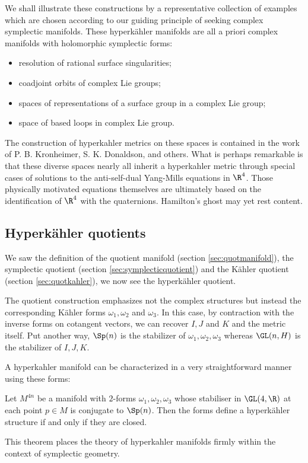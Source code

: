 \documentclass{worksheetclass}
\begin{document}
        We shall illustrate these constructions by a representative collection of examples which are chosen according to our guiding principle of seeking complex symplectic manifolds. These hyperkähler manifolds are all a priori complex manifolds with holomorphic symplectic forms:
        \begin{itemize}
            \item resolution of rational surface singularities;
            \item coadjoint orbits of complex Lie groups;
            \item spaces of representations of a surface group in a complex Lie group;
            \item space of based loops in complex Lie group.
        \end{itemize}
        The construction of hyperkahler metrics on these spaces is contained in the work of P. B. Kronheimer, S. K. Donaldson, and others. What is perhaps remarkable is that these diverse spaces nearly all inherit a hyperkahler metric through special cases of solutions to the anti-self-dual Yang-Mills equations in $\R^4$. Those physically motivated equations themselves are ultimately based on the identification of $\R^4$ with the quaternions. Hamilton's ghost may yet rest content.

    \subsection{Hyperkähler quotients}

        We saw the definition of the quotient manifold (section \ref{sec:quotmanifold}), the symplectic quotient (section \ref{sec:symplecticquotient}) and the Kähler quotient (section \ref{sec:quotkahler}), we now see the hyperkähler quotient.

        The quotient construction emphasizes not the complex structures but instead the corresponding Kähler forms $\omega_1,\omega_2$ and $\omega_3$. In this case, by contraction with the inverse forms on cotangent vectors, we can recover $I,J$ and $K$ and the metric itself. Put another way, $\Sp(n)$ is the stabilizer of $\omega_1, \omega_2, \omega_3$ whereas $\GL(n, H)$ is the stabilizer of $I,J,K$.

        A hyperkahler manifold can be characterized in a very straightforward manner using these forms:
        \begin{theorem}
            Let $M^{4n}$ be a manifold with $2$-forms $\omega_1,\omega_2,\omega_3$ whose stabiliser in $\GL(4,\R)$ at each point $p\in M$ is conjugate to $\Sp(n)$. Then the forms define a hyperkähler structure if and only if they are closed.
        \end{theorem}
        This theorem places the theory of hyperkahler manifolds firmly within the context of symplectic geometry.
\end{document}
